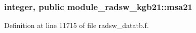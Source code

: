 \subsubsection[{\texorpdfstring{msa21}{msa21}}]{\setlength{\rightskip}{0pt plus 5cm}integer, public module\+\_\+radsw\+\_\+kgb21\+::msa21}\hypertarget{namespacemodule__radsw__kgb21_a235b17e9b4b37668028c572f80e1188a}{}\label{namespacemodule__radsw__kgb21_a235b17e9b4b37668028c572f80e1188a}


Definition at line 11715 of file radsw\+\_\+datatb.\+f.

